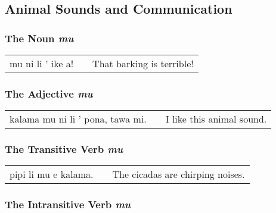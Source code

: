 %
%
%
%
\subsection*{Animal Sounds and Communication}
%

%
\subsubsection*{The Noun \textit{mu}}

\begin{supertabular}{p{5,5cm}|ll}
mu ni li ' ike a! && That barking is terrible! \\
\end{supertabular} 

%
\subsubsection*{The Adjective  \textit{mu}}

\begin{supertabular}{p{5,5cm}|ll}
kalama mu ni li ' pona, tawa mi. && I like this animal sound.\\
\end{supertabular} 

%
\subsubsection*{The Transitive Verb \textit{mu}}

\begin{supertabular}{p{5,5cm}|ll}
pipi li mu e kalama. && The cicadas are chirping noises.  \\
\end{supertabular} 

%
\subsubsection*{The Intransitive Verb \textit{mu}}

